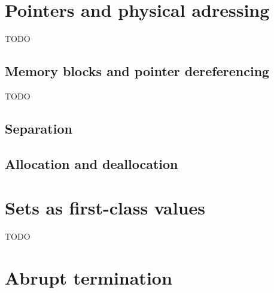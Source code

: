 \section{Pointers and physical adressing}
\label{sec:pointers}

TODO


\subsection{Memory blocks and pointer dereferencing}
\label{subsec:memory}

TODO


\subsection{Separation}
\label{sec:separated}

\absent


\subsection{Allocation and deallocation}

\absent


\section{Sets as first-class values}

TODO


\section{Abrupt termination}
\label{sec:abrupt-clauses}

